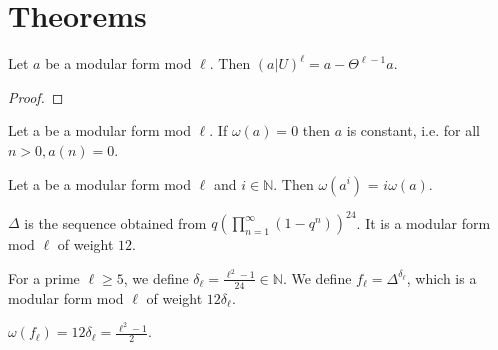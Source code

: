 \section{Theorems}

\begin{theorem}
  \label{thm:U_pow_l_eq_self_sub_Theta_pow_l_sub_one}
  \leanok
  Let $a$ be a modular form mod $\ell$. Then $(a|U) ^ \ell = a - \Theta^{\ell - 1} a$.
\end{theorem}
\begin{proof}
  \leanok
\end{proof}


\begin{lemma}
  \label{lem:const_of_Filt_zero}
  \leanok
  Let a be a modular form mod $\ell$. If $\omega (a) = 0$ then $a$ is constant, 
  i.e. for all $n > 0, a(n) = 0$.
\end{lemma}

\begin{theorem}
  \label{thm:Filtration_Log}
  \leanok
  Let a be a modular form mod $\ell$ and $i \in \mathbb{N}$. 
  Then $\omega (a ^ i)$ = $i \omega (a)$.
\end{theorem}

\begin{definition}[Delta]
  \label{def:Delta}
  \leanok
  
  $\Delta$ is the sequence obtained from $q (\prod_{n = 1}^{\infty} (1 - q^n))^{24}$.
  It is a modular form mod $\ell$ of weight $12$. 
\end{definition}

\begin{definition}
  \label{def:f_l}
  \leanok
  For a prime $\ell \ge 5$, we define $\delta_\ell = \frac{\ell^2 - 1}{24} \in \mathbb{N}$. 
  We define $f_\ell = \Delta^{\delta_\ell}$, which is a modular form mod $\ell$ of weight $12 \delta_\ell$. 
\end{definition}

\begin{lemma}
  \label{lem:Filt_fl}
  \leanok
  $ \omega (f_\ell) = 12 \delta_\ell = \frac{\ell^2 - 1}{2}.$
\end{lemma}

